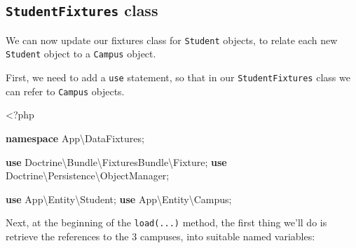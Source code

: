 \documentclass[a4paperpaper,openright]{book}
\newenvironment{Shaded}{}{}
\newcommand{\CommentTok}[1]{\textcolor[rgb]{0.38,0.63,0.69}{\textit{#1}}}
\newcommand{\KeywordTok}[1]{\textcolor[rgb]{0.00,0.44,0.13}{\textbf{#1}}}
\newcommand{\NormalTok}[1]{#1}
\newcommand{\OtherTok}[1]{\textcolor[rgb]{0.00,0.44,0.13}{#1}}
\newcommand{\StringTok}[1]{\textcolor[rgb]{0.25,0.44,0.63}{#1}}
\begin{document}
\hypertarget{studentfixtures-class}{%
\subsection{\texorpdfstring{\texttt{StudentFixtures}
class}{StudentFixtures class}}\label{studentfixtures-class}}

We can now update our fixtures class for \texttt{Student} objects, to
relate each new \texttt{Student} object to a \texttt{Campus} object.

First, we need to add a \texttt{use} statement, so that in our
\texttt{StudentFixtures} class we can refer to \texttt{Campus} objects.

\begin{Shaded}
\begin{Highlighting}[]
\NormalTok{    <}\OtherTok{?}\NormalTok{php}
    
    \KeywordTok{namespace}\NormalTok{ App\textbackslash{}DataFixtures}\OtherTok{;}
    
    \KeywordTok{use}\NormalTok{ Doctrine\textbackslash{}Bundle\textbackslash{}FixturesBundle\textbackslash{}Fixture}\OtherTok{;}
    \KeywordTok{use}\NormalTok{ Doctrine\textbackslash{}Persistence\textbackslash{}ObjectManager}\OtherTok{;}
    
    \KeywordTok{use}\NormalTok{ App\textbackslash{}Entity\textbackslash{}Student}\OtherTok{;}
    \KeywordTok{use}\NormalTok{ App\textbackslash{}Entity\textbackslash{}Campus}\OtherTok{;}
\end{Highlighting}
\end{Shaded}

Next, at the beginning of the \texttt{load(...)} method, the first thing
we'll do is retrieve the references to the 3 campuses, into suitable
named variables:

\begin{Shaded}
\end{Shaded}
\end{document}
